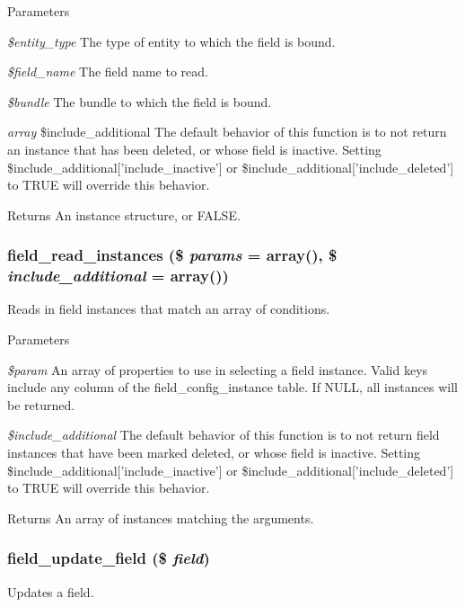 \begin{DoxyParams}{Parameters}
\item[{\em \$entity\_\-type}]The type of entity to which the field is bound. \item[{\em \$field\_\-name}]The field name to read. \item[{\em \$bundle}]The bundle to which the field is bound. \item[{\em array}]\$include\_\-additional The default behavior of this function is to not return an instance that has been deleted, or whose field is inactive. Setting \$include\_\-additional\mbox{[}'include\_\-inactive'\mbox{]} or \$include\_\-additional\mbox{[}'include\_\-deleted'\mbox{]} to TRUE will override this behavior. \end{DoxyParams}
\begin{DoxyReturn}{Returns}
An instance structure, or FALSE. 
\end{DoxyReturn}
\hypertarget{group__field__crud_ga1d162c4a29778ee31d1d815324223ae6}{
\subsubsection[{field\_\-read\_\-instances}]{\setlength{\rightskip}{0pt plus 5cm}field\_\-read\_\-instances (\$ {\em params} = {\ttfamily array()}, \/  \$ {\em include\_\-additional} = {\ttfamily array()})}}
\label{group__field__crud_ga1d162c4a29778ee31d1d815324223ae6}
Reads in field instances that match an array of conditions.


\begin{DoxyParams}{Parameters}
\item[{\em \$param}]An array of properties to use in selecting a field instance. Valid keys include any column of the field\_\-config\_\-instance table. If NULL, all instances will be returned. \item[{\em \$include\_\-additional}]The default behavior of this function is to not return field instances that have been marked deleted, or whose field is inactive. Setting \$include\_\-additional\mbox{[}'include\_\-inactive'\mbox{]} or \$include\_\-additional\mbox{[}'include\_\-deleted'\mbox{]} to TRUE will override this behavior. \end{DoxyParams}
\begin{DoxyReturn}{Returns}
An array of instances matching the arguments. 
\end{DoxyReturn}
\hypertarget{group__field__crud_gacca7d1f76963048aa84b1c9a271876f5}{
\subsubsection[{field\_\-update\_\-field}]{\setlength{\rightskip}{0pt plus 5cm}field\_\-update\_\-field (\$ {\em field})}}
\label{group__field__crud_gacca7d1f76963048aa84b1c9a271876f5}
Updates a field.


